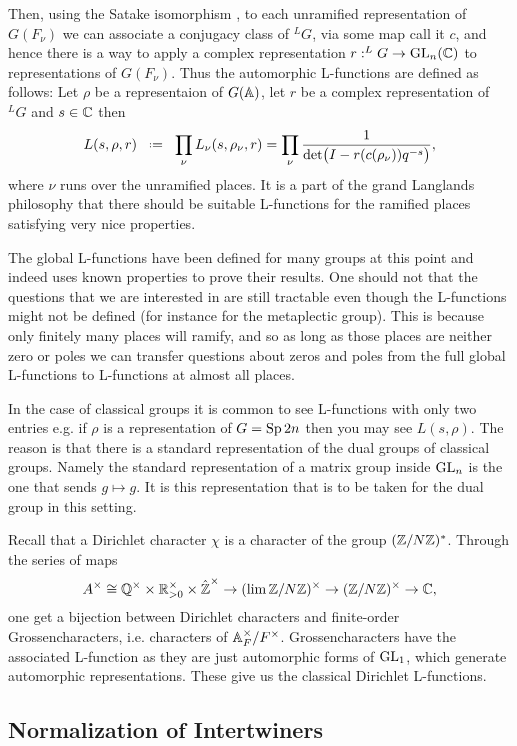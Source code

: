 Then, using the Satake isomorphism \cite[2.2]{shahidiEisensteinSeriesAutomorphic2010}, to each unramified representation of \(G(F_\nu)\) we can associate a conjugacy class of \(^LG\), via some map call it \(c\), and hence there is a way to apply a complex representation \(r: ^LG \to \GL_n(\C)\) to representations of \(G(F_\nu)\). Thus the automorphic L-functions are defined as follows: Let \(\rho\) be a representaion of \(G(\A)\), let \(r\) be a complex representation of \(^LG\) and \(s\in \C\) then 
\[L(s, \rho, r) \defeq \prod_\nu L_\nu(s, \rho_\nu, r ) = \prod_\nu \frac{1}{\det\bigl( I - r(c(\rho_\nu))q^{-s} \bigr)}  ,\]
where \(\nu\) runs over the unramified places. It is a part of the grand Langlands philosophy that there should be suitable L-functions for the ramified places satisfying very nice properties.

\begin{remark}
    The global L-functions have been defined for many groups at this point and indeed \cite{jiangPolesCertainResidual2013} uses known properties to prove their results. One should not that the questions that we are interested in are still tractable even though the L-functions might not be defined (for instance for the metaplectic group). This is because only finitely many places will ramify, and so as long as those places are neither zero or poles we can transfer questions about zeros and poles from the full global L-functions to L-functions at almost all places. 
\end{remark}

\begin{example}
    In the case of classical groups it is common to see L-functions with only two entries e.g. if \(\rho\) is a representation of \(G = \operatorname{Sp}{2n}\) then you may see 
    \(L(s, \rho).\)
    The reason is that there is a standard representation of the dual groups of classical groups. Namely the standard representation of a matrix group inside \(\operatorname{GL}_n\) is the one that sends \(g\mapsto g\). It is this representation that is to be taken for the dual group in this setting.
\end{example}


\begin{example}
    Recall that a Dirichlet character \(\chi\) is a character of the group \((\Z/N\Z)^*\). Through the series of maps 
    \[A^\times \cong \Q^\times \times \R_{>0}^\times \times \hat{\Z}^\times \to (\lim \Z/N\Z)^\times \to (\Z/N\Z)^\times \to \C,\]
    one get a bijection between Dirichlet characters and finite-order Grossencharacters, i.e. characters of \(\A_F^\times/F^\times\).
    Grossencharacters have the associated L-function as they are just automorphic forms of \(\operatorname{GL}_1\), which generate automorphic representations. These give us the classical Dirichlet L-functions.
\end{example}

\subsection{Normalization of Intertwiners}

